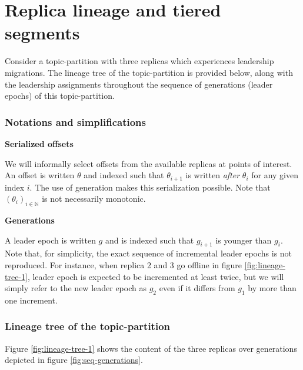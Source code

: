 \documentclass{article}
\begin{document}
\section{Replica lineage and tiered segments}

Consider a topic-partition with three replicas which experiences leadership migrations. The lineage tree of the topic-partition is provided below, along with the leadership assignments throughout the sequence of generations (leader epochs) of this topic-partition.

\subsubsection{Notations and simplifications}

\textbf{Serialized offsets}

We will informally select offsets from the available replicas at points of interest. An offset is written $\theta$ and indexed such that $\theta_{i+1}$ is written \textit{after} $\theta_i$ for any given index $i$. The use of generation makes this serialization possible. Note that $(\theta_i)_{i \in \mathbb{N}}$ is not necessarily monotonic.

\textbf{Generations}

A leader epoch is written $g$ and is indexed such that $g_{i+1}$ is younger than $g_i$. Note that, for simplicity, the exact sequence of incremental leader epochs is not reproduced. For instance, when replica 2 and 3 go offline in figure \ref{fig:lineage-tree-1}, leader epoch is expected to be incremented at least twice, but we will simply refer to the new leader epoch as $g_2$ even if it differs from $g_1$ by more than one increment.

\subsubsection{Lineage tree of the topic-partition}

Figure \ref{fig:lineage-tree-1} shows the content of the three replicas over generations depicted in figure \ref{fig:seq-generations}.
\end{document}
